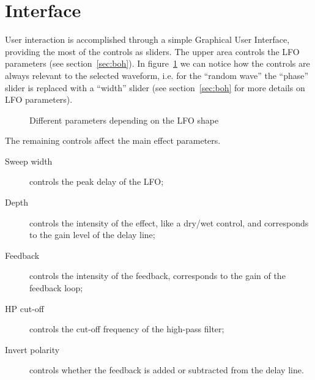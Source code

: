 \section{Interface}\label{sec:gui}

User interaction is accomplished through a simple Graphical User Interface, providing the most of the controls as sliders.
The upper area controls the LFO parameters (see section~\ref{sec:boh}). In figure~\ref{fig:gui-lfo} we can notice how the controls are always relevant to the selected waveform, i.e. for the ``random wave'' the ``phase'' slider is replaced with a ``width'' slider (see section~\ref{sec:boh} for more details on LFO parameters).

\begin{figure}[H]
	\centering
	\caption{Different parameters depending on the LFO shape}
	\label{fig:gui-lfo}
\end{figure}

The remaining controls affect the main effect parameters.

\begin{description}
	\item[Sweep width] controls the peak delay of the LFO;
	\item[Depth] controls the intensity of the effect, like a dry/wet control, and corresponds to the gain level of the delay line;
	\item[Feedback] controls the intensity of the feedback, corresponds to the gain of the feedback loop;
	\item[HP cut-off] controls the cut-off frequency of the high-pass filter;
	\item[Invert polarity] controls whether the feedback is added or subtracted from the delay line.
\end{description}

